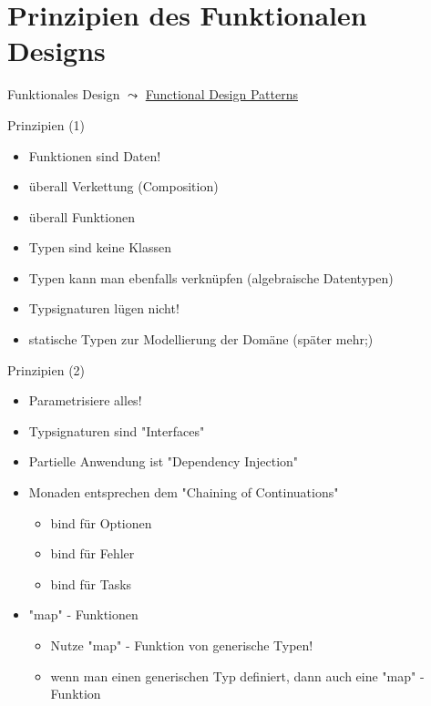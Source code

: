 \documentclass[t]{beamer}
\begin{document}
\section{Prinzipien des Funktionalen Designs }
\label{sec:org7afb2c6}
\begin{frame}[label={sec:orgcc0319b}]{Funktionales Design}
\(\leadsto\) \href{./3.1 Functional Design Patterns.pdf}{Functional Design Patterns}
\end{frame}

\begin{frame}[label={sec:org089c18f}]{Prinzipien (1)}
\begin{itemize}
\item Funktionen sind Daten!
\item überall Verkettung (Composition)
\item überall Funktionen
\item Typen sind keine Klassen
\item Typen kann man ebenfalls verknüpfen (algebraische Datentypen)
\item Typsignaturen lügen nicht!
\item statische Typen zur Modellierung der Domäne (später mehr;)
\end{itemize}
\end{frame}

\begin{frame}[label={sec:org48a8169}]{Prinzipien (2)}
\begin{itemize}
\item Parametrisiere alles!
\item Typsignaturen sind "Interfaces"
\item Partielle Anwendung ist "Dependency Injection"
\item Monaden entsprechen dem "Chaining of Continuations"
\begin{itemize}
\item bind für Optionen
\item bind für Fehler
\item bind für Tasks
\end{itemize}
\item "map" - Funktionen
\begin{itemize}
\item Nutze "map" - Funktion von generische Typen!
\item wenn man einen generischen Typ definiert, dann auch eine "map" - Funktion
\end{itemize}
\end{itemize}
\end{frame}
\end{document}
